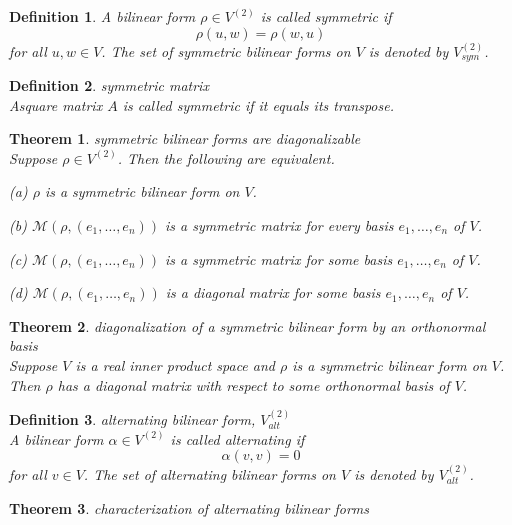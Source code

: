 \documentclass{article}
\newtheorem{theorem}{Theorem}[subsection]
\newtheorem{definition}{Definition}[subsection]
\begin{document}
\begin{CJK}{UTF8}{gkai}
\begin{definition}
    A bilinear form $\rho \in V^{(2)}$ is called symmetric if
    \[\rho(u,w) = \rho(w,u)\]
    for all $u, w \in V$. The set of symmetric bilinear forms on $V$ is denoted by $V^{(2)}_{sym}$.
\end{definition}

\begin{definition}
    symmetric matrix\\

    Asquare matrix $A$ is called symmetric if it equals its transpose.
\end{definition}

\begin{theorem}
    symmetric bilinear forms are diagonalizable\\

    Suppose $\rho \in V^{(2)}$. Then the following are equivalent.

    (a) $\rho$ is a symmetric bilinear form on $V$.

    (b) $\mathcal{M}(\rho,(e_1,\ldots,e_n))$ is a symmetric matrix for every basis $e_1,\ldots,e_n$ of $V$.
    
    (c) $\mathcal{M}(\rho,(e_1,\ldots,e_n))$ is a symmetric matrix for some basis $e_1,\ldots,e_n$ of $V$.

    (d) $\mathcal{M}(\rho,(e_1,\ldots,e_n))$ is a diagonal matrix for some basis $e_1,\ldots,e_n$ of $V$.
\end{theorem}

\begin{theorem}
    diagonalization of a symmetric bilinear form by an orthonormal basis\\

    Suppose $V$ is a real inner product space and $\rho$ is a symmetric bilinear form on $V$. Then $\rho$ has a diagonal matrix with respect to some orthonormal basis of $V$.
\end{theorem}

\begin{definition}
    alternating bilinear form, $V^{(2)}_{alt}$\\

    A bilinear form $\alpha \in V^{(2)}$ is called alternating if 
    \[\alpha(v, v) = 0\]
    for all $v \in V$. The set of alternating bilinear forms on $V$ is denoted by $V^{(2)}_{alt}$. 
\end{definition}

\begin{theorem}
    characterization of alternating bilinear forms\\


\end{theorem}
\end{CJK}
\end{document}
